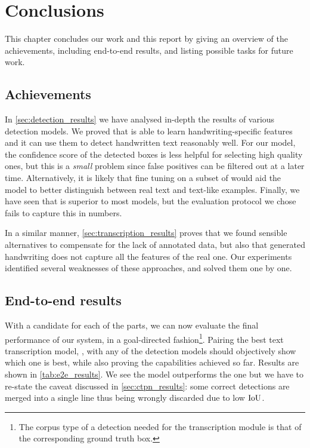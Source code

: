 
\chapter{Conclusions}\label{ch:conclusions}
This chapter concludes our work and this report by giving an overview of the achievements, including end-to-end results, and listing possible tasks for future work.

\section{Achievements}
In \autoref{sec:detection_results} we have analysed in-depth the results of various detection models. We proved that \FRCNN{} is able to learn handwriting-specific features and it can use them to detect handwritten text reasonably well. For our model, the confidence score of the detected boxes is less helpful for selecting high quality ones, but this is a \emph{small} problem since false positives can be filtered out at a later time. Alternatively, it is likely that fine tuning on a subset of  would aid the model to better distinguish between real text and text-like examples. Finally, we have seen that \CTPN{} is superior to most \FRCNN{} models, but the evaluation protocol we chose fails to capture this in numbers.

In a similar manner, \autoref{sec:transcription_results} proves that we found sensible alternatives to compensate for the lack of annotated data, but also that generated handwriting does not capture all the features of the real one. Our experiments identified several weaknesses of these approaches, and solved them one by one.

\section{End-to-end results}
With a candidate for each of the parts, we can now evaluate the final performance of our system, in a goal-directed fashion\footnote{The corpus type of a detection needed for the transcription module is that of the corresponding ground truth box.}. Pairing the best text transcription model, , with any of the detection models should objectively show which one is best, while also proving the capabilities achieved so far. Results are shown in \autoref{tab:e2e_results}. We see the \FRCNN{} model outperforms the \CTPN{} one but we have to re-state the caveat discussed in \autoref{sec:ctpn_results}: some correct \CTPN{} detections are merged into a single line thus being wrongly discarded due to low \(\operatorname{IoU}\).

